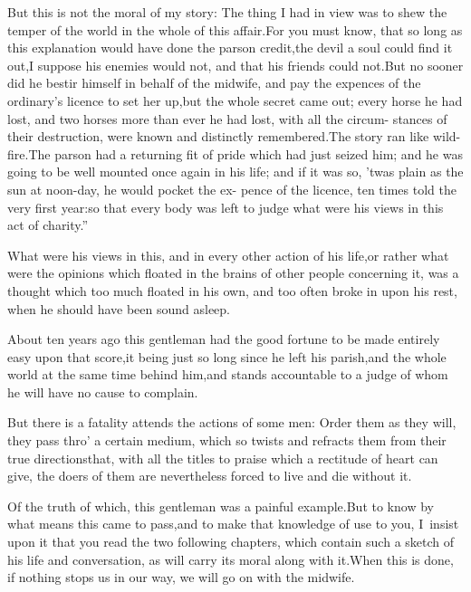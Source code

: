 \documentclass{article}
\begin{document}
But this is not the moral of my story: The thing I had in view
was to shew the temper of the world in the whole of this
affair.\tsk For you must know, that so long as this explanation
would have done the parson credit,\tsk the devil a soul could
find it out,\tsk I suppose his enemies would not, and that his
friends could not.\tsh But no sooner did he bestir himself in
behalf of the midwife, and pay the expences of 
the ordinary’s licence to set her up,\tsk but\break
the whole secret came out; every horse\break
he had lost, and two horses more than\break
ever he had lost, with all the circum-\break
stances of their destruction, were known\break
and distinctly remembered.\tsk The story\break
ran like wild-fire.\tsk\lqq The parson had\break
\lqq a returning fit of pride which had just\break
\lqq seized him; and he was going to be\break
\lqq well mounted once again in his life;\break
\lqq and if it was so, ’twas plain as the sun\break
\lqq at noon-day, he would pocket the ex-\break
\lqq pence of the licence, ten times told the\break
\lqq very first year:\tsk so that every body\break
\lqq was left to judge what were his views\break
\lqq in this act of charity.”

What were his views in this, and in every other action of his
life,\tsk or rather what were the opinions which floated in the
brains of other people concerning it, was a thought which too much
floated in his own, and too often broke in upon his rest, when he
should have been sound asleep.

About ten years ago this gentleman had the good fortune to be
made entirely easy upon that score,\tsk it being just so long
since he left his parish,\tsk and the whole world at the same
time behind him,\tsk and stands accountable to a judge of whom he
will have no cause to complain.

But there is a fatality attends the actions of some men: Order
them as they will, they pass thro’ a certain medium, which so twists and refracts them from their true
directions\tsh that, with all the titles to praise which a
rectitude of heart can give, the doers of them are nevertheless
forced to live and die without it.

Of the truth of which, this gentleman was a painful
example.\tsh But to know by what means this came to
pass,\tsk and to make that knowledge of use to you, I~insist upon
it that you read the two following chapters, which contain such a
sketch of his life and conversation, as will carry its moral along
with it.\tsk When this is done, if nothing stops us in our way,
we will go on with the midwife.
\end{document}
